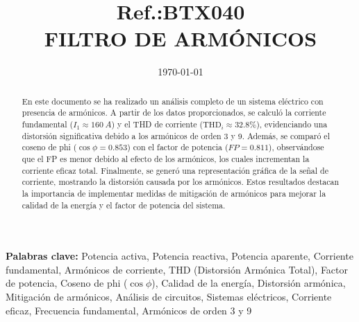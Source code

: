 \documentclass[a4paper,10pt]{article}
\title{{\small Ref.:\uppercase{Btx040}}\\{\textbf{FILTRO DE ARMÓNICOS}}}
\author{
    \begin{minipage}{0.35\textwidth}
    \centering
    \end{minipage}%
    \hfill
    \begin{minipage}{0.35\textwidth}
    \centering
    \end{minipage}%
    \hfill
    \begin{minipage}{0.35\textwidth}
    \centering
    \end{minipage}%
}
\date{\today}
\begin{document}
\begin{Form}

	\maketitle

	\begin{abstract}

En este documento se ha realizado un análisis completo de un sistema eléctrico con presencia de armónicos. A partir de los datos proporcionados, se calculó la corriente fundamental (\(I_1 \approx \SI{160}{A}\)) y el THD de corriente (\(\text{THD}_i \approx 32.8\%\)), evidenciando una distorsión significativa debido a los armónicos de orden 3 y 9. Además, se comparó el coseno de phi (\(\cos \phi = 0.853\)) con el factor de potencia (\(FP = 0.811\)), observándose que el FP es menor debido al efecto de los armónicos, los cuales incrementan la corriente eficaz total. Finalmente, se generó una representación gráfica de la señal de corriente, mostrando la distorsión causada por los armónicos. Estos resultados destacan la importancia de implementar medidas de mitigación de armónicos para mejorar la calidad de la energía y el factor de potencia del sistema.
        	\end{abstract}


	\noindent\textbf{Palabras clave:} Potencia activa, Potencia reactiva, Potencia aparente, Corriente fundamental, Armónicos de corriente, THD (Distorsión Armónica Total), Factor de potencia, Coseno de phi (\(\cos \phi\)), Calidad de la energía, Distorsión armónica, Mitigación de armónicos, Análisis de circuitos, Sistemas eléctricos, Corriente eficaz, Frecuencia fundamental, Armónicos de orden 3 y 9


	\tableofcontents  %
	\listoffigures    %

	\newpage



    









































\end{Form}
\end{document}
